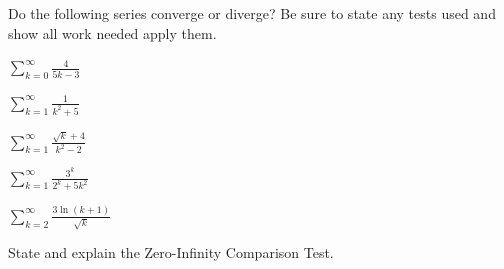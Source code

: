 \documentclass{exam}[12pt]
\begin{document}
\pagestyle{head}

\extraheadheight{.3in}
\extrafootheight{-.3in} 


\vspace{.2in}
\large{

Do the following series converge or diverge? Be sure to state any
tests used and show all work needed apply them.

\begin{questions}

\question $\displaystyle
\sum_{k=0}^\infty \frac{4}{5k-3} $ 
\vspace{1in}

\question $\displaystyle
\sum_{k=1}^\infty \frac{1}{k^2+5} $ 
\vspace{1in}

\question $\displaystyle
\sum_{k=1}^\infty \frac{\sqrt{ k}+4}{k^2 - 2} $ 
\vspace{1in}

\question $\displaystyle
\sum_{k=1}^\infty \frac{3^k}{2^k + 5k^2} $ 
\vspace{1in}

\question $\displaystyle \sum_{k=2}^\infty\frac{3\ln(k+1)}{\sqrt{k}}$
\vspace{1in}

\question State and explain the Zero-Infinity Comparison Test.

\end{questions}

}
\end{document}
